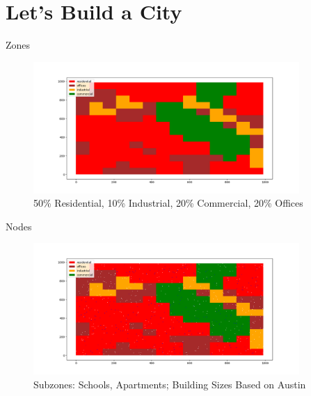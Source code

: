 \documentclass[10pt, aspectratio=169]{beamer}
\begin{document}
\section{Let's Build a City}

\begin{frame}{Zones}
    \begin{center}
        \begin{figure}
            \centering
            \includegraphics[height=5cm, keepaspectratio]{images/build_city/zones.png}
            \caption{50\% Residential, 10\% Industrial, 20\% Commercial, 20\% Offices}
        \end{figure}
    \end{center}
\end{frame}

\begin{frame}{Nodes}
    \begin{center}
        \begin{figure}
            \centering
            \includegraphics[height=5cm, keepaspectratio]{images/build_city/nodes.png}
            \caption{Subzones: Schools, Apartments; Building Sizes Based on Austin}
        \end{figure}
    \end{center}
\end{frame}
\end{document}
